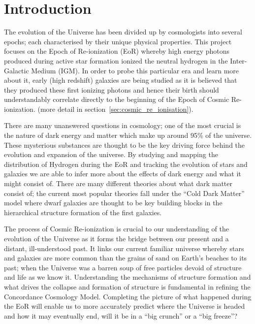 
\section{Introduction} %
\label{section:Introduction}
	The evolution of the Universe has been divided up by cosmologists into several epochs; each characterised by their unique physical properties. This project focuses on the Epoch of Re-ionization (EoR) whereby high energy photons produced during active star formation ionized the neutral hydrogen in the Inter-Galactic Medium (IGM). In order to probe this particular era and learn more about it, early (high redshift) galaxies are being studied as it is believed that they produced these first ionizing photons and hence their birth should understandably correlate directly to the beginning of the Epoch of Cosmic Re-ionization. (more detail in section~\ref{sec:cosmic_re_ionisation}).

	There are many unanswered questions in cosmology; one of the most crucial is the nature of dark energy and matter which make up around 95\% of the universe\cite{WMAP9}. These mysterious substances are thought to be the key driving force behind the evolution and expansion of the universe. By studying and mapping the distribution of Hydrogen during the EoR and tracking the evolution of stars and galaxies we are able to infer more about the effects of dark energy and what it might consist of. There are many different theories about what dark matter consist of; the current most popular theories fall under the ``Cold Dark Matter'' model where dwarf galaxies are thought to be key building blocks in the hierarchical structure formation of the first galaxies\cite{Cignoni}.

	The process of Cosmic Re-ionization is crucial to our understanding of the evolution of the Universe as it forms the bridge between our present and a distant, ill-understood past. It links our current familiar universe whereby stars and galaxies are more common than the grains of sand on Earth's beaches to its past; when the Universe was a barren soup of free particles devoid of structure and life as we know it. Understanding the mechanisms of structure formation and what drives the collapse and formation of structure is fundamental in refining the Concordance Cosmology Model. Completing the picture of what happened during the EoR will enable us to more accurately predict where the Universe is headed and how it may eventually end, will it be in a ``big crunch'' or a ``big freeze''?

